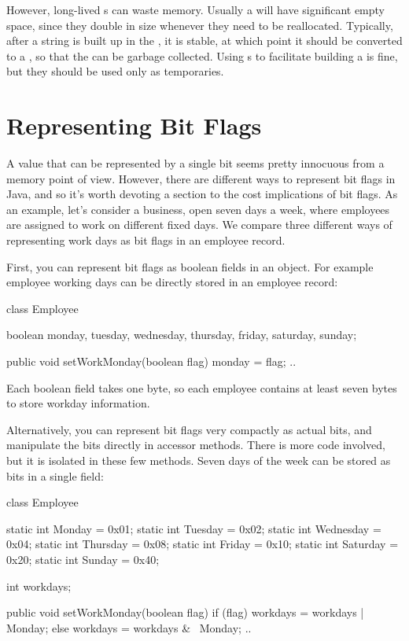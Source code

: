 However, long-lived s can waste memory. Usually a
 will have significant empty space, since they double in
size whenever they need to be reallocated. Typically, after a string is built up in the
, it is stable, at which point it should be converted 
to a , so that the  can be
garbage collected. Using s to facilitate
building a  is fine, but they should be used only as temporaries.

\section{Representing Bit Flags}
\label{sec:bit-flags}

A value that can be represented by a single bit seems pretty innocuous from a
memory point of view. However, there are different ways to represent bit flags
in Java, and so it's worth devoting a section to the cost implications of
bit flags. As an example, let's consider a business, open seven days a
week, where employees are assigned to work on different fixed days.  We compare three
different ways of representing work days as bit flags in an employee record.
 
First, you can represent bit flags as boolean fields in an object. For example
employee working days can be directly stored in an employee record:
\begin{shortlisting}

    class Employee {
    	boolean monday, tuesday, wednesday, thursday, friday, saturday, sunday;
    	
    	public void setWorkMonday(boolean flag) {
    		monday = flag;
    	}
    	..
    }
    
\end{shortlisting}
Each boolean field takes one byte, so each employee contains at least seven
bytes to store workday information. 

Alternatively, you can represent bit flags very compactly as actual bits, and
manipulate the bits directly in accessor methods. There is more code involved,
but it is isolated in these few methods. Seven days of the week can be stored as
bits in a single field:

\begin{shortlisting}
	class Employee {
	
		static int Monday = 0x01;
		static int Tuesday = 0x02;
		static int Wednesday = 0x04;
		static int Thursday = 0x08;
		static int Friday = 0x10;
		static int Saturday = 0x20;
		static int Sunday = 0x40;
		
		int workdays;
		
		public void setWorkMonday(boolean flag) {
			if (flag) {
				workdays = workdays | Monday;
			} else {
				workdays = workdays & ~Monday;
			}
		}
		..
   }
		       
\end{shortlisting}

